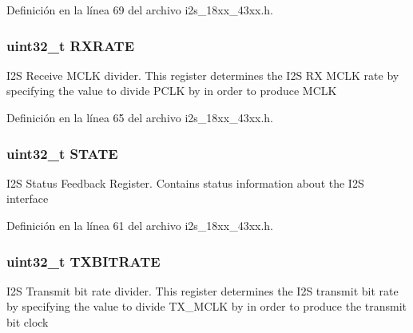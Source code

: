 Definición en la línea 69 del archivo i2s\+\_\+18xx\+\_\+43xx.\+h.

\subsubsection[{\texorpdfstring{R\+X\+R\+A\+TE}{RXRATE}}]{ uint32\+\_\+t R\+X\+R\+A\+TE}\hypertarget{struct_l_p_c___i2_s___t_a1c3274d93523a3c6edfbfc8625b4e9f9}{}\label{struct_l_p_c___i2_s___t_a1c3274d93523a3c6edfbfc8625b4e9f9}
I2S Receive M\+C\+LK divider. This register determines the I2S RX M\+C\+LK rate by specifying the value to divide P\+C\+LK by in order to produce M\+C\+LK 

Definición en la línea 65 del archivo i2s\+\_\+18xx\+\_\+43xx.\+h.

\subsubsection[{\texorpdfstring{S\+T\+A\+TE}{STATE}}]{ uint32\+\_\+t S\+T\+A\+TE}\hypertarget{struct_l_p_c___i2_s___t_add23853bd7ab6e0c9e57fc63b7403d45}{}\label{struct_l_p_c___i2_s___t_add23853bd7ab6e0c9e57fc63b7403d45}
I2S Status Feedback Register. Contains status information about the I2S interface 

Definición en la línea 61 del archivo i2s\+\_\+18xx\+\_\+43xx.\+h.

\subsubsection[{\texorpdfstring{T\+X\+B\+I\+T\+R\+A\+TE}{TXBITRATE}}]{ uint32\+\_\+t T\+X\+B\+I\+T\+R\+A\+TE}\hypertarget{struct_l_p_c___i2_s___t_a397223cebffbdcceb4b774587e0dcf58}{}\label{struct_l_p_c___i2_s___t_a397223cebffbdcceb4b774587e0dcf58}
I2S Transmit bit rate divider. This register determines the I2S transmit bit rate by specifying the value to divide T\+X\+\_\+\+M\+C\+LK by in order to produce the transmit bit clock 

